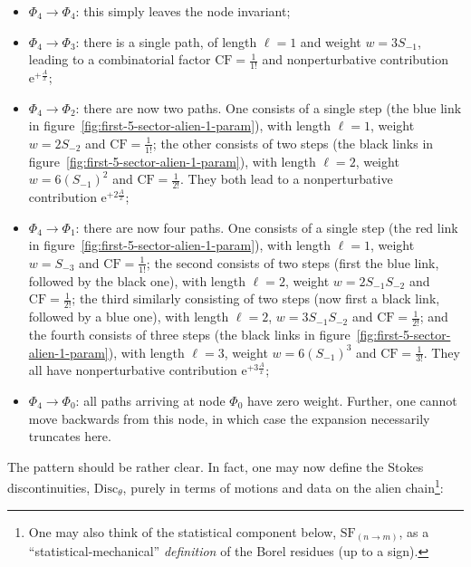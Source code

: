 \documentclass[11pt,a4paper]{article}
\def\disc{{\mathrm{Disc}}}
\newcommand{\rme}{{\mathrm{e}}}
\begin{document}
\begin{itemize}
%
\begin{itemize}
%
\item $\Phi_4\rightarrow\Phi_4$: this simply leaves the node invariant;
%
\item $\Phi_4\rightarrow\Phi_3$: there is a single path, of length $\ell=1$ and weight $w = 3 S_{-1}$, leading to a combinatorial factor $\mathrm{CF}=\frac{1}{1!}$ and nonperturbative contribution $\rme^{+\frac{A}{x}}$;
%
\item $\Phi_4\rightarrow\Phi_2$: there are now two paths. One consists of a single step (the blue link in figure~\ref{fig:first-5-sector-alien-1-param}), with length $\ell=1$, weight $w = 2 S_{-2}$ and $\mathrm{CF}=\frac{1}{1!}$; the other consists of two steps (the black links in figure~\ref{fig:first-5-sector-alien-1-param}), with length $\ell=2$, weight $w = 6 \left( S_{-1} \right)^2$ and $\mathrm{CF}=\frac{1}{2!}$. They both lead to a nonperturbative contribution $\rme^{+2\frac{A}{x}}$;
%
\item $\Phi_4\rightarrow\Phi_1$: there are now four paths. One consists of a single step (the red link in figure~\ref{fig:first-5-sector-alien-1-param}), with length $\ell=1$, weight $w = S_{-3}$ and $\mathrm{CF}=\frac{1}{1!}$; the second consists of two steps (first the blue link, followed by the black one), with length $\ell=2$, weight $w = 2  S_{-1} S_{-2}$ and $\mathrm{CF}=\frac{1}{2!}$;  the third similarly consisting of two steps (now first a black link, followed by a blue one), with length $\ell=2$, $w = 3 S_{-1} S_{-2}$ and $\mathrm{CF}=\frac{1}{2!}$; and the fourth consists of three steps (the black links in figure~\ref{fig:first-5-sector-alien-1-param}), with length $\ell=3$, weight $w = 6 \left( S_{-1} \right)^3$ and $\mathrm{CF}=\frac{1}{3!}$. They all have nonperturbative contribution $\rme^{+3\frac{A}{x}}$;
%
\item $\Phi_4\rightarrow\Phi_0$: all paths arriving at node $\Phi_0$ have zero weight. Further, one cannot move backwards from this node, in which case the expansion necessarily truncates here.
%
\end{itemize}
%
\end{itemize}
%
\noindent
The pattern should be rather clear. In fact, one may now define the Stokes discontinuities, $\disc_{\theta}$, purely in terms of motions and data on the alien chain\footnote{One may also think of the statistical component below, $\mathrm{SF}_{(n \rightarrow m)}$, as a ``statistical-mechanical'' \textit{definition} of the Borel residues (up to a sign).}:
\end{document}
